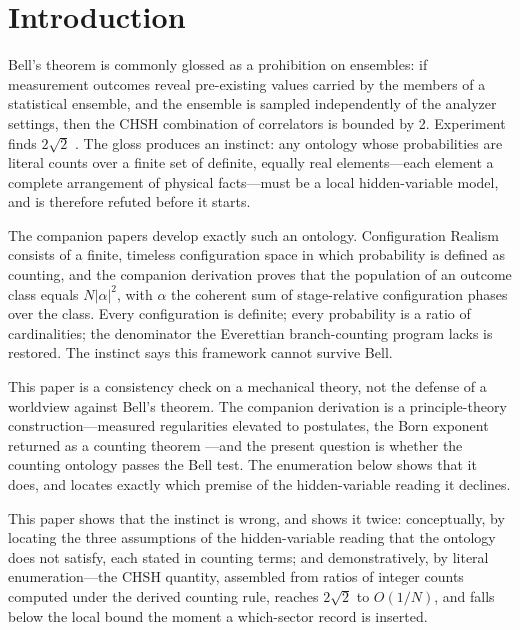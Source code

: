 \documentclass[11pt]{article}
\theoremstyle{definition}
\theoremstyle{remark}
\begin{document}
\section{Introduction}\label{sec:intro}
Bell's theorem \cite{Bell1964} is commonly glossed as a prohibition on ensembles: if measurement outcomes reveal pre-existing values carried by the members of a statistical ensemble, and the ensemble is sampled independently of the analyzer settings, then the CHSH combination of correlators \cite{CHSH1969} is bounded by 2. Experiment finds $2\sqrt{2}$ \cite{Aspect1982,Hensen2015}. The gloss produces an instinct: any ontology whose probabilities are literal counts over a finite set of definite, equally real elements---each element a complete arrangement of physical facts---must be a local hidden-variable model, and is therefore refuted before it starts.

The companion papers develop exactly such an ontology. Configuration Realism \cite{TillittCR} consists of a finite, timeless configuration space in which probability is defined as counting, and the companion derivation \cite{TillittBorn} proves that the population of an outcome class equals $N|\alpha|^2$, with $\alpha$ the coherent sum of stage-relative configuration phases over the class. Every configuration is definite; every probability is a ratio of cardinalities; the denominator the Everettian branch-counting program lacks \cite{Graham1973,Wallace2012} is restored. The instinct says this framework cannot survive Bell.

This paper is a consistency check on a mechanical theory, not the defense of a worldview against Bell's theorem. The companion derivation is a principle-theory construction---measured regularities elevated to postulates, the Born exponent returned as a counting theorem \cite{TillittBorn}---and the present question is whether the counting ontology passes the Bell test. The enumeration below shows that it does, and locates exactly which premise of the hidden-variable reading it declines.

This paper shows that the instinct is wrong, and shows it twice: conceptually, by locating the three assumptions of the hidden-variable reading that the ontology does not satisfy, each stated in counting terms; and demonstratively, by literal enumeration---the CHSH quantity, assembled from ratios of integer counts computed under the derived counting rule, reaches $2\sqrt{2}$ to $O(1/N)$, and falls below the local bound the moment a which-sector record is inserted.
\end{document}

